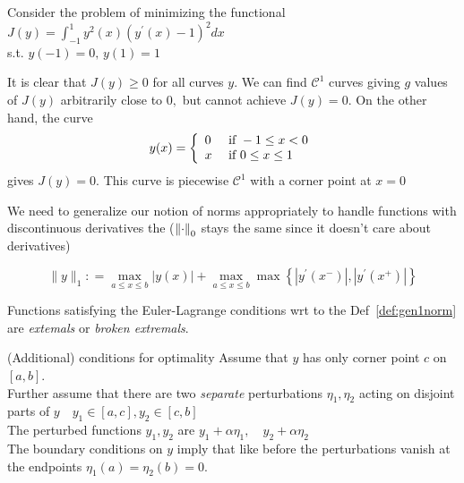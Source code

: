 \documentclass{beamer}
\begin{document}
    \begin{frame}
        \begin{example}
            Consider the problem of minimizing the functional
            \(J ( y ) = \int _ { - 1 } ^ { 1 } y ^ { 2 } ( x ) \left( y ^ { \prime } ( x ) - 1 \right)^ { 2 } d x
            \)\\
            s.t.
            \(y ( - 1 ) = 0 , \,  y ( 1 ) = 1 \)
        \end{example}

         It is clear that $J ( y ) \geq 0$ for all curves $y .$ We can find $\mathcal { C } ^ { 1 }$ curves giving $g$
        values of $J ( y )$ arbitrarily close to $0 ,$ but cannot achieve $J ( y ) = 0 .$ On the
        other hand, the curve
        \begin{equation*}
            y ( x ) = \left\{ \begin{array} { l l } { 0 } & { \text { if } - 1 \leq x < 0 } \\ { x } & { \text { if } 0 \leq x \leq 1 } \end{array} \right.
        \end{equation*}
        gives $J ( y ) = 0 .$ This curve is piecewise $\mathcal { C } ^ { 1 }$ with a corner point at $x = 0$
    \end{frame}
    \begin{frame}
        We need to generalize our notion of norms appropriately to handle functions with discontinuous derivatives the (\(\left\lVert{\cdot}\right\rVert_0\) stays the same since it doesn't care about derivatives)
        \begin{definition}\label{def:gen1norm}
            \begin{equation*}
                \| y \| _ { 1 } : = \max _ { a \leq x \leq b } | y ( x ) | + \max _ { a \leq x \leq b } \max \left\{ \left| y ^ { \prime } \left( x ^ { - } \right) \right| , \left| y ^ { \prime } \left( x ^ { + } \right) \right| \right\}
            \end{equation*}
        \end{definition}
        Functions satisfying the Euler-Lagrange conditions wrt to the Def~\ref{def:gen1norm} are \emph{extemals} or \emph{broken extremals}.
    \end{frame}
   \begin{frame}{(Additional) conditions for optimality}
       Assume that $y$ has only corner point $c$ on \(\left[a,b\right]\).\\
       \medskip
       Further assume that  there are two \emph{separate} perturbations \(\eta_1,\eta_2\) acting on disjoint parts of \(y \quad y_1 \in \left[a,c\right], y_2 \in \left[c,b\right]\)\\ \medskip
       The perturbed functions \(y_1,y_2\) are \(y_1 + \alpha \eta_1, \quad y_2 + \alpha \eta_2\)\\ \medskip
       The boundary conditions on $y$ imply that like before the perturbations vanish at the endpoints $\eta_1(a)=\eta_2(b)=0$.\\\medskip
   \end{frame}
\end{document}
